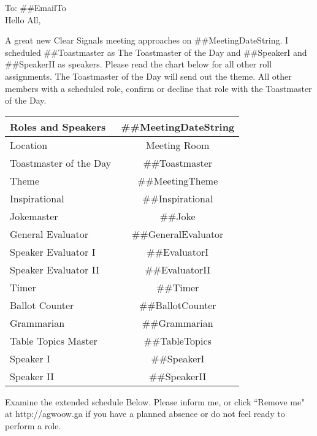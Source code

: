 \documentclass{article}
\newcommand{\emailTo}{##EmailTo}
\newcommand{\meetingDateString}{##MeetingDateString}
\newcommand{\meetingTheme}{##MeetingTheme}
\newcommand{\toastmaster}{##Toastmaster}
\newcommand{\tableTopics}{##TableTopics}
\newcommand{\generalEvaluator}{##GeneralEvaluator}
\newcommand{\evaluatorI}{##EvaluatorI}
\newcommand{\evaluatorII}{##EvaluatorII}
\newcommand{\speakerI}{##SpeakerI}
\newcommand{\speakerII}{##SpeakerII}
\newcommand{\grammarian}{##Grammarian}
\newcommand{\timer}{##Timer}
\newcommand{\inspirational}{##Inspirational}
\newcommand{\ballotCounter}{##BallotCounter}
\newcommand{\joke}{##Joke}
\begin{document}
To: \emailTo{} \\

 Hello All,
 
   A great new Clear Signals meeting approaches on \meetingDateString{}.  I scheduled \toastmaster{} as The Toastmaster of the Day and \speakerI{} and \speakerII{} as speakers.  Please read the chart below for all other roll assignments.  The Toastmaster of the Day will send out the theme.  All other members with a scheduled role, confirm or decline that role with the Toastmaster of the Day.   

  
  \begin{tabular}{ |l|c| }
    \hline
    Roles and Speakers & \meetingDateString{} \\
    \hline
    Location & Meeting Room \\
    \hline
    Toastmaster of the Day & \toastmaster{} \\
    \hline
    Theme & \meetingTheme{} \\
    \hline
    Inspirational & \inspirational{} \\
    \hline
    Jokemaster & \joke{} \\
    \hline
    General Evaluator & \generalEvaluator{} \\
    \hline
    Speaker Evaluator I & \evaluatorI{} \\
    \hline
    Speaker Evaluator II & \evaluatorII{} \\
    \hline
    Timer & \timer{} \\
    \hline
    Ballot Counter & \ballotCounter{} \\
    \hline
    Grammarian & \grammarian{} \\
    \hline
    Table Topics Master & \tableTopics{} \\
    \hline\hline
    Speaker I & \speakerI{} \\
    \hline
    Speaker II & \speakerII{} \\
    \hline
  \end{tabular}
  
  Examine the extended schedule Below.  Please inform me, or click ``Remove me" at http://agwoow.ga if you have a planned absence or do not feel ready to perform a role. 
  
\end{document}
